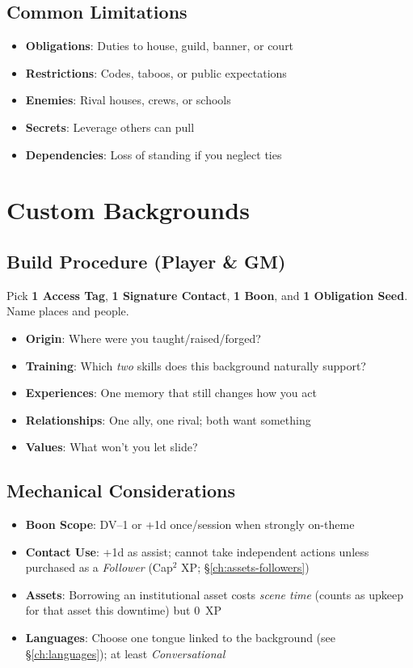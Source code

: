 \subsection*{Common Limitations}
\begin{itemize}
\item \textbf{Obligations}: Duties to house, guild, banner, or court
\item \textbf{Restrictions}: Codes, taboos, or public expectations
\item \textbf{Enemies}: Rival houses, crews, or schools
\item \textbf{Secrets}: Leverage others can pull
\item \textbf{Dependencies}: Loss of standing if you neglect ties
\end{itemize}

\section{Custom Backgrounds}

\subsection*{Build Procedure (Player \& GM)}
Pick \textbf{1 Access Tag}, \textbf{1 Signature Contact}, \textbf{1 Boon}, and \textbf{1 Obligation Seed}. Name places and people.
\begin{itemize}
\item \textbf{Origin}: Where were you taught/raised/forged?
\item \textbf{Training}: Which \emph{two} skills does this background naturally support?
\item \textbf{Experiences}: One memory that still changes how you act
\item \textbf{Relationships}: One ally, one rival; both want something
\item \textbf{Values}: What won't you let slide?
\end{itemize}

\subsection*{Mechanical Considerations}
\begin{itemize}
\item \textbf{Boon Scope}: DV--1 or +1d once/session when strongly on-theme
\item \textbf{Contact Use}: +1d as assist; cannot take independent actions unless purchased as a \emph{Follower} (Cap$^2$ XP; \S\ref{ch:assets-followers})
\item \textbf{Assets}: Borrowing an institutional asset costs \emph{scene time} (counts as upkeep for that asset this downtime) but \(0\)~XP
\item \textbf{Languages}: Choose one tongue linked to the background (see \S\ref{ch:languages}); at least \emph{Conversational}
\end{itemize}

